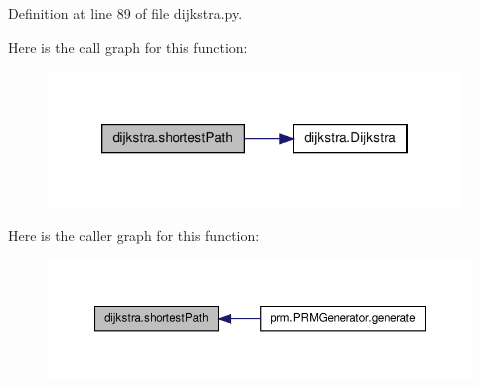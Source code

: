 Definition at line 89 of file dijkstra.\-py.



Here is the call graph for this function\-:\nopagebreak
\begin{figure}[H]
\begin{center}
\leavevmode
\includegraphics[width=310pt]{namespacedijkstra_a20424eb142377bdf202ef03812875d83_cgraph}
\end{center}
\end{figure}




Here is the caller graph for this function\-:\nopagebreak
\begin{figure}[H]
\begin{center}
\leavevmode
\includegraphics[width=350pt]{namespacedijkstra_a20424eb142377bdf202ef03812875d83_icgraph}
\end{center}
\end{figure}



